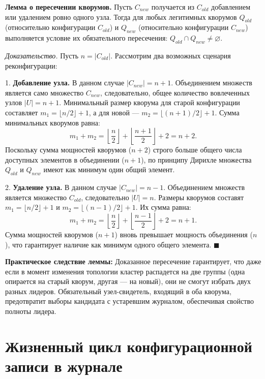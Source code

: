 \textbf{Лемма о пересечении кворумов.} Пусть $C_{new}$ получается из $C_{old}$ добавлением или удалением ровно одного узла. Тогда для любых легитимных кворумов $Q_{old}$ (относительно конфигурации $C_{old}$) и $Q_{new}$ (относительно конфигурации $C_{new}$) выполняется условие их обязательного пересечения: $Q_{old} \cap Q_{new} \neq \varnothing$.

\textit{Доказательство.}
Пусть $n = |C_{old}|$. Рассмотрим два возможных сценария реконфигурации:

1. \textbf{Добавление узла.} В данном случае $|C_{new}| = n + 1$. Объединением множеств является само множество $C_{new}$, следовательно, общее количество вовлеченных узлов $|U| = n + 1$.
Минимальный размер кворума для старой конфигурации составляет $m_1 = \lfloor n/2 \rfloor + 1$, а для новой — $m_2 = \lfloor (n+1)/2 \rfloor + 1$.
Сумма минимальных кворумов равна:
\begin{equation}
m_1 + m_2 = \left\lfloor \frac{n}{2} \right\rfloor + \left\lfloor \frac{n+1}{2} \right\rfloor + 2 = n + 2.
\end{equation}
Поскольку сумма мощностей кворумов ($n + 2$) строго больше общего числа доступных элементов в объединении ($n + 1$), по принципу Дирихле множества $Q_{old}$ и $Q_{new}$ имеют как минимум один общий элемент.

2. \textbf{Удаление узла.} В данном случае $|C_{new}| = n - 1$. Объединением множеств является множество $C_{old}$, следовательно $|U| = n$.
Размеры кворумов составят $m_1 = \lfloor n/2 \rfloor + 1$ и $m_2 = \lfloor (n-1)/2 \rfloor + 1$.
Их сумма равна:
\begin{equation}
m_1 + m_2 = \left\lfloor \frac{n}{2} \right\rfloor + \left\lfloor \frac{n-1}{2} \right\rfloor + 2 = n + 1.
\end{equation}
Сумма мощностей кворумов ($n + 1$) вновь превышает мощность объединения ($n$), что гарантирует наличие как минимум одного общего элемента.
\hfill$\blacksquare$

\textbf{Практическое следствие леммы:} Доказанное пересечение гарантирует, что даже если в момент изменения топологии кластер распадется на две группы (одна опирается на старый кворум, другая — на новый), они не смогут избрать двух разных лидеров. Обязательный узел-свидетель, входящий в оба кворума, предотвратит выборы кандидата с устаревшим журналом, обеспечивая свойство полноты лидера.

\section{Жизненный цикл конфигурационной записи в журнале}
\label{sec:mem-lifecycle}

